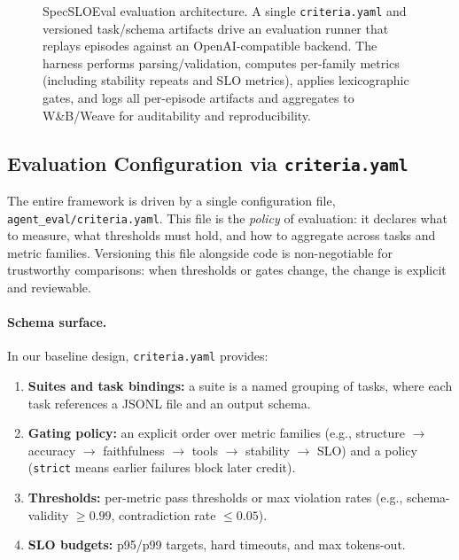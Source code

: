 \begin{figure}[t]
\caption{SpecSLOEval evaluation architecture.
A single \texttt{criteria.yaml} and versioned task/schema artifacts drive an evaluation runner that replays episodes against an OpenAI-compatible backend.
The harness performs parsing/validation, computes per-family metrics (including stability repeats and SLO metrics), applies lexicographic gates, and logs all per-episode artifacts and aggregates to W\&B/Weave for auditability and reproducibility.}
\label{fig:eval-arch}
\end{figure}

\subsection{Evaluation Configuration via \texttt{criteria.yaml}}
\label{sec:criteria-yaml}

The entire framework is driven by a single configuration file, \texttt{agent\_eval/criteria.yaml}.
This file is the \emph{policy} of evaluation: it declares what to measure, what thresholds must hold, and how to aggregate across tasks and metric families.
Versioning this file alongside code is non-negotiable for trustworthy comparisons: when thresholds or gates change, the change is explicit and reviewable.

\paragraph{Schema surface.}
In our baseline design, \texttt{criteria.yaml} provides:

\begin{enumerate}[leftmargin=12pt]
    \item \textbf{Suites and task bindings:} a suite is a named grouping of tasks, where each task references a JSONL file and an output schema.
    \item \textbf{Gating policy:} an explicit order over metric families (e.g., structure $\rightarrow$ accuracy $\rightarrow$ faithfulness $\rightarrow$ tools $\rightarrow$ stability $\rightarrow$ SLO) and a policy (\texttt{strict} means earlier failures block later credit).
    \item \textbf{Thresholds:} per-metric pass thresholds or max violation rates (e.g., schema-validity $\ge 0.99$, contradiction rate $\le 0.05$).
    \item \textbf{SLO budgets:} p95/p99 targets, hard timeouts, and max tokens-out.
\end{enumerate}

